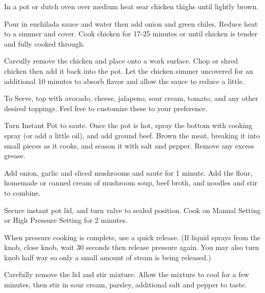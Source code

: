 \documentclass{cookbook}
\begin{document}
In a pot or dutch oven over medium heat sear chicken thighs until lightly brown.

Pour in enchilada sauce and water then add onion and green chiles. Reduce heat to a simmer and cover. Cook chicken for 17-25 minutes or until chicken is tender and fully cooked through.

Careully remove the chicken and place onto a work surface. Chop or shred chicken then add it back into the pot. Let the chicken simmer uncovered for an additional 10 minutes to absorb flavor and allow the sauce to reduce a little.

To Serve, top with avocado, cheese, jalapeno, sour cream, tomato, and any other desired toppings. Feel free to customize these to your preference.



Turn Instant Pot to saute. Once the pot is hot, spray the bottom with cooking spray (or add a little oil), and add ground beef. Brown the meat, breaking it into small pieces as it cooks, and season it with salt and pepper. Remove any excess grease.

Add onion, garlic and sliced mushrooms and saute for 1 minute. Add the flour, homemade or canned cream of mushroom soup, beef broth, and noodles and stir to combine.

Secure instant pot lid, and turn valve to sealed position. Cook on Manual Setting or High Pressure Setting for 2 minutes.

When pressure cooking is complete, use a quick release. (If liquid sprays from the knob, close knob, wait 30 seconds then release pressure again. You may also turn knob half way so only a small amount of steam is being released.)

Carefully remove the lid and stir mixture. Allow the mixture to cool for a few minutes, then stir in sour cream, parsley, additional salt and pepper to taste.
\end{document}
